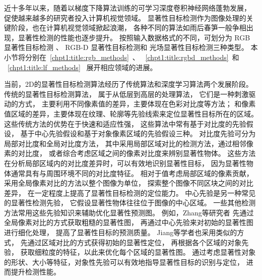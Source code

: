 


近十多年以来，随着以梯度下降算法训练的可学习深度卷积神经网络蓬勃发展，
促使越来越多的研究者投入计算机视觉领域。
显著性目标检测作为图像处理的关键阶段，也在计算机视觉领域掀起浪潮，
各种不同的算法如雨后春笋一般争相出现，显著性检测的性能也逐步提升。
按照输入数据格式的不同，可划分为
RGB 显著性目标检测
、
RGB-D 显著性目标检测和
光场显著性目标检测三种类型。
本小节将分别在~\ref{chpt1:title:rgb_methods}~、
~\ref{chpt1:title:rgbd_methods}~和
~\ref{chpt1:title:lf_methods}~
展开相应领域的进展。



\label{chpt1:title:rgb_methods}


当前，2D的显著性目标检测算法经历了传统算法和深度学习算法两个发展阶段。
传统的显著性目标检测算法，
属于从低层到高层的处理算法，
它们是一种刺激驱动的方式，
主要利用不同像素值的差异，主要体现在色彩对比度等方法；
和像素值区域的差异，主要体现在纹理、轮廓等先验线索来定位显著性目标所在的区域。
这些传统方法的优势在于快速和适应性强，
这些算法中常有基于对比度的先验假设，
基于中心先验假设和基于对象像素区域的先验假设三种。
对比度先验可分为局部对比度和全局对比度方法，
其中采用局部区域对比的检测方法，通过相邻像素的对比度，
或者综合考虑区域之间的像素对比度来辨别显著性物体。
这些方法在分析局部区域内的对比度差异时，可以有效地识别显著性目标，
因为显著性物体通常具有与周围环境不同的对比度特征。
相对于值考虑局部区域的像素贡献，
采用全局像素对比的方法以整个图像为单位，
探索整个图像不同区块之间的对比差异，
在一定程度上提高了显著性目标检测的定位能力。
中心先验是另一种常见的显著性检测先验，
它假设显著性物体往往位于图像的中心区域。
一些其他检测方法常用这些先验知识来辅助优化显著性预测图。
例如，Zhang等研究者
先通过全局像素对比的方式获取粗糙的显著性图，
再通过中心先验来对初始的显著性图进行细化处理，
提高了显著性目标的预测质量。
Jiang等学者也采用类似的方式，
先通过区域对比的方式获得初始的显著性定位，
再根据各个区域的对象先验，
获取细粒度的特征，以此来优化每个区域的显著性图。
通过考虑显著性对象的形状、大小等特征，对象性先验可以有效地指导显著性目标的识别与定位，
进而提升检测性能。



